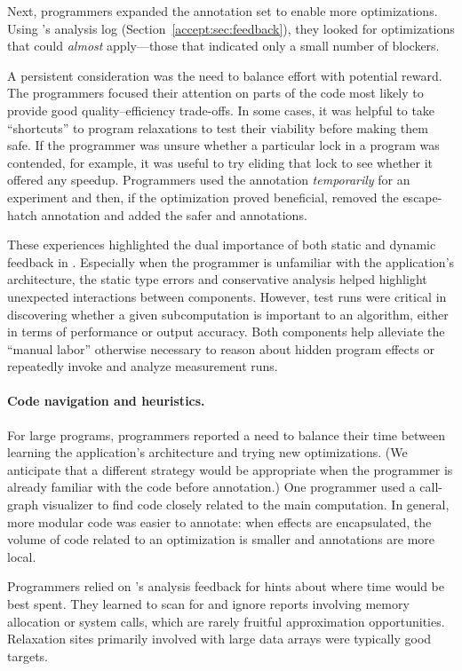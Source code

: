 Next, programmers expanded the annotation set to enable more optimizations.
Using \sysname's analysis log (Section~\ref{accept:sec:feedback}), they looked for
optimizations that could \emph{almost} apply---those that indicated only a
small number of blockers.

A persistent consideration was the need to balance effort with potential
reward.  The programmers focused their attention on parts of the code
most likely to provide good quality--efficiency trade-offs.
In some cases, it was helpful to take ``shortcuts'' to program relaxations to
test their viability before making them safe.
If the programmer was unsure whether a particular lock in a
program was contended, for example, it was useful to try eliding that lock to
see whether it offered any speedup.
Programmers used the \annpermit annotation
\emph{temporarily} for an experiment and then, if the optimization proved
beneficial, removed the escape-hatch annotation and added the safer
 and  annotations.

These experiences highlighted the dual importance of both static and dynamic
feedback in \sysname.
Especially when the programmer is unfamiliar with the application's
architecture, the static type errors and conservative \precisepurity analysis
helped highlight unexpected interactions between components.
However, test runs were critical in discovering whether a
given subcomputation is important to an algorithm, either in terms of
performance or output accuracy.
Both components help alleviate the ``manual labor'' otherwise necessary to
reason about hidden program effects or repeatedly invoke and analyze
measurement runs.

\paragraph{Code navigation and heuristics.}
For large programs, programmers reported a need to balance their time
between learning the application's architecture and trying new
optimizations.
(We anticipate that a different strategy would be appropriate when the
programmer is already familiar with the code before annotation.)
One programmer used a call-graph visualizer to find code closely related
to the main computation.
In general, more modular code was easier to annotate: when effects are
encapsulated, the volume of code related to an optimization is smaller
and annotations are more local.

Programmers relied on \sysname's analysis feedback for hints about where time
would be best spent.
They learned to scan for and ignore reports involving memory allocation
or system calls, which are rarely fruitful approximation opportunities.
Relaxation sites primarily involved with large data arrays were typically good
targets.

